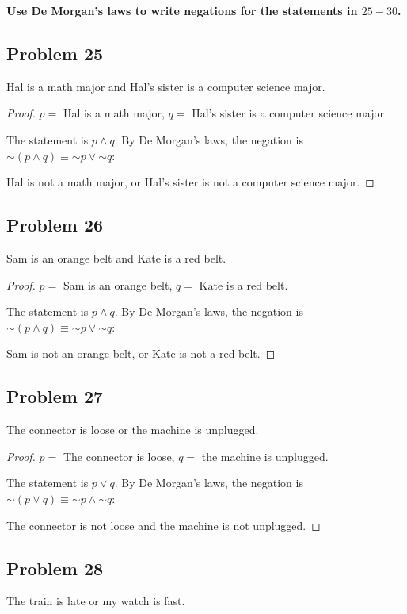 \documentclass[14pt]{extarticle}
\begin{document}
{\bf Use De Morgan’s laws to write negations for the statements in $25-30$.}

\subsection{Problem 25}
Hal is a math major and Hal’s sister is a computer science major.

\begin{proof}
$p =$ Hal is a math major, $q =$ Hal’s sister is a computer science major

The statement is $p \wedge q$. By De Morgan's laws, the negation is $\sim(p
\wedge q) \equiv {\sim p} \vee {\sim q}$:

Hal is not a math major, or Hal's sister is not a computer science major.
\end{proof}

\subsection{Problem 26}
Sam is an orange belt and Kate is a red belt.

\begin{proof}
$p =$ Sam is an orange belt, $q =$ Kate is a red belt.

The statement is $p \wedge q$. By De Morgan's laws, the negation is $\sim(p
\wedge q) \equiv {\sim p} \vee {\sim q}$:

Sam is not an orange belt, or Kate is not a red belt.
\end{proof}

\subsection{Problem 27}
The connector is loose or the machine is unplugged.

\begin{proof}
$p =$ The connector is loose, $q =$ the machine is unplugged.

The statement is $p \vee q$. By De Morgan's laws, the negation is $\sim(p \vee
q) \equiv {\sim p} \wedge {\sim q}$:

The connector is not loose and the machine is not unplugged.
\end{proof}

\subsection{Problem 28}
The train is late or my watch is fast.
\end{document}
